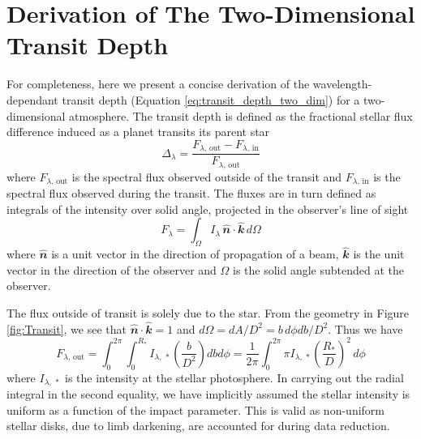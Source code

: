 \documentclass[fleqn,usenatbib]{mnras}
\begin{document}


\appendix

\section{Derivation of The Two-Dimensional Transit Depth}\label{Appendix:derivation}

For completeness, here we present a concise derivation of the wavelength-dependant transit depth (Equation \ref{eq:transit_depth_two_dim}) for a two-dimensional atmosphere. The transit depth is defined as the fractional stellar flux difference induced as a planet transits its parent star
%
\begin{equation}
\Delta_{\lambda} = \frac{F_{\lambda,\, \mathrm{out}}-F_{\lambda,\, \mathrm{in}}}{F_{\lambda,\, \mathrm{out}}}
\label{eq:transit_depth}
\end{equation}
%
where $F_{\lambda, \, \mathrm{out}}$ is the spectral flux observed outside of the transit and $F_{\lambda, \, \mathrm{in}}$ is the spectral flux observed during the transit. The fluxes are in turn defined as integrals of the intensity over solid angle, projected in the observer's line of sight \citep{Seager_book}
%
\begin{equation}
F_{\lambda} = \int_{\Omega} I_{\lambda} \, \hat{\mathbfit{n}} \cdot \hat{\mathbfit{k}} \,  d\Omega
\label{eq:flux}
\end{equation}
% 
where $\hat{\mathbfit{n}}$ is a unit vector in the direction of propagation of a beam, $\hat{\mathbfit{k}}$ is the unit vector in the direction of the observer and $\Omega$ is the solid angle subtended at the observer.

The flux outside of transit is solely due to the star. From the geometry in Figure \ref{fig:Transit}, we see that $\hat{\mathbfit{n}} \cdot \hat{\mathbfit{k}} = 1$ and $d\Omega= dA/D^2 = b \, d\phi db/D^2$. Thus we have
%
\begin{equation}
F_{\lambda, \, \mathrm{out}} = \int_{0}^{2\pi} \int_{0}^{R_*} I_{\lambda,\, *} \left(\frac{b}{D^2}\right) db d\phi = \frac{1}{2\pi} \int_{0}^{2\pi} \pi I_{\lambda, \, *} \left(\frac{R_{*}}{D}\right)^2 \, d\phi
\label{eq:F_out}
\end{equation}
%
where $I_{\lambda,\, *}$ is the intensity at the stellar photosphere. In carrying out the radial integral in the second equality, we have implicitly assumed the stellar intensity is uniform as a function of the impact parameter. This is valid as non-uniform stellar disks, due to limb darkening, are accounted for during data reduction.
\end{document}
